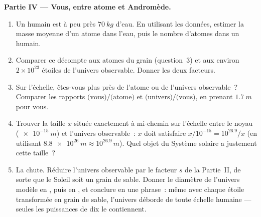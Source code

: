 \begin{problem}
\medskip
\noindent\textbf{Partie IV --- Vous, entre atome et Andromède.}
\begin{enumerate}[resume]
  \item Un humain est à peu près $\qty{70}{kg}$ d'eau. En utilisant
        les données, estimer la masse moyenne d'un atome dans l'eau,
        puis le nombre d'atomes dans un humain.
  \item Comparer ce décompte aux atomes du grain (question~3) et aux
        environ $2\times10^{23}$ étoiles de l'univers observable.
        Donner les deux facteurs.
  \item Sur l'échelle, êtes-vous plus près de l'atome ou de l'univers
        observable~? Comparer les rapports
        $\text{(vous)}/\text{(atome)}$ et
        $\text{(univers)}/\text{(vous)}$, en prenant $\qty{1.7}{m}$
        pour vous.
  \item Trouver la taille $x$ située exactement à mi-chemin sur
        l'échelle entre le noyau ($\qty{e-15}{m}$) et l'univers
        observable~: $x$ doit satisfaire
        $x / 10^{-15} = 10^{26.9} / x$ (en utilisant
        $\qty{8.8e26}{m} \approx 10^{26.9}\,\unit{m}$). Quel objet du
        Système solaire a justement cette taille~?
  \item La chute. Réduire l'univers observable par le facteur $s$ de
        la Partie~II, de sorte que le Soleil soit un grain de sable.
        Donner le diamètre de l'univers modèle en , puis en
        , et conclure en une phrase~: même
        avec chaque étoile transformée en grain de sable, l'univers
        déborde de toute échelle humaine --- seules les puissances de
        dix le contiennent.
\end{enumerate}
\end{problem}
